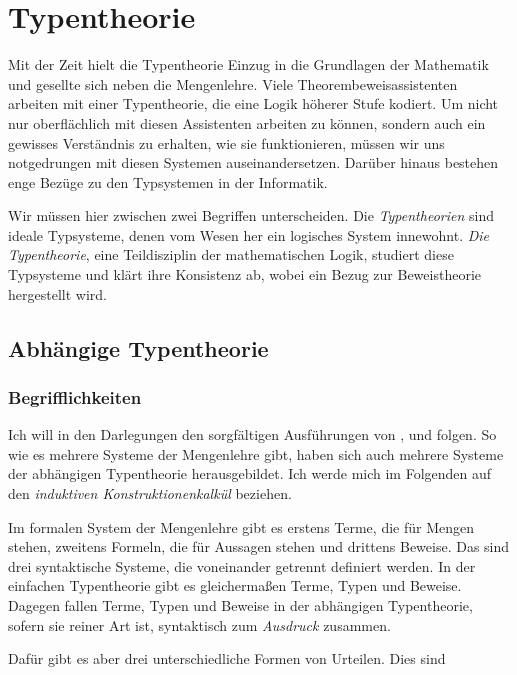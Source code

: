 
\chapter{Typentheorie}

Mit der Zeit hielt die Typentheorie Einzug in die Grundlagen der Mathematik
und gesellte sich neben die Mengenlehre. Viele Theorembeweisassistenten
arbeiten mit einer Typentheorie, die eine Logik höherer Stufe kodiert.
Um nicht nur oberflächlich mit diesen Assistenten arbeiten zu können, sondern
auch ein gewisses Verständnis zu erhalten, wie sie funktionieren, müssen wir
uns notgedrungen mit diesen Systemen auseinandersetzen. Darüber hinaus
bestehen enge Bezüge zu den Typsystemen in der Informatik.

Wir müssen hier zwischen zwei Begriffen unterscheiden. Die
\emph{Typentheorien} sind ideale Typsysteme, denen
vom Wesen her ein logisches System innewohnt. \emph{Die Typentheorie},
eine Teildisziplin der mathematischen Logik, studiert diese Typsysteme
und klärt ihre Konsistenz ab, wobei ein Bezug zur Beweistheorie
hergestellt wird.

\section{Abhängige Typentheorie}

\subsection{Begrifflichkeiten}

Ich will in den Darlegungen den sorgfältigen Ausführungen von
\cite{Avigad}, \cite{Mimram} und \cite{HoTT} folgen. So wie es mehrere
Systeme der Mengenlehre gibt, haben sich auch mehrere Systeme der
abhängigen Typentheorie herausgebildet. Ich werde mich im Folgenden
auf den \emph{induktiven Konstruktionenkalkül} beziehen.

Im formalen System der Mengenlehre gibt es erstens Terme, die für Mengen
stehen, zweitens Formeln, die für Aussagen stehen und drittens Beweise.
Das sind drei syntaktische Systeme, die voneinander getrennt definiert
werden. In der einfachen Typentheorie gibt es gleichermaßen Terme, Typen und
Beweise. Dagegen fallen Terme, Typen und Beweise in der abhängigen
Typentheorie, sofern sie reiner Art ist, syntaktisch zum \emph{Ausdruck}
zusammen.

Dafür gibt es aber drei unterschiedliche Formen von Urteilen.%
 Dies sind

